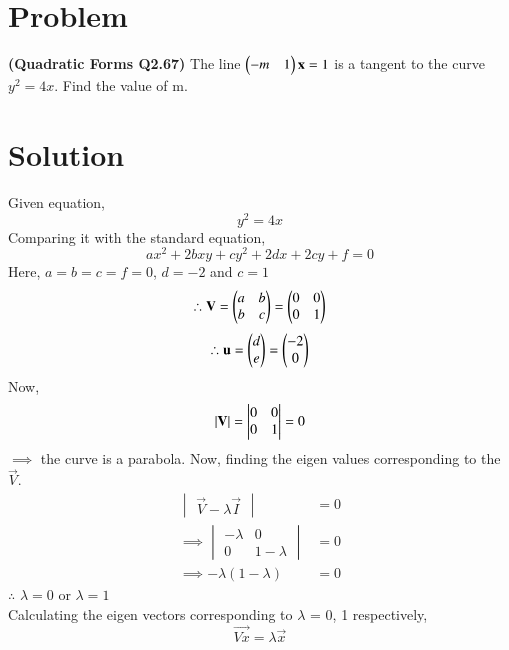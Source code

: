 \documentclass[journal,12pt,twocolumn]{IEEEtran}
\begin{document}
\section*{\textbf{Problem}}
\textbf{(Quadratic Forms Q2.67)} The line $\begin{pmatrix}-m & 1\end{pmatrix}\mathbf{x} = 1$ is a tangent to the curve $y^2 = 4x$. Find the value of m. 
\section*{\textbf{Solution}}
Given equation,
\begin{equation}
    y^2 = 4x
\end{equation}
Comparing it with the standard equation,
\begin{equation}
    ax^2 + 2bxy + cy^2 + 2dx + 2cy + f = 0
\end{equation}
Here, 
$a = b = c = f = 0$, $d = -2$ and $c = 1$
\begin{equation}
    \therefore \mathbf{V} = \begin{pmatrix}a & b \\ b & c\end{pmatrix} = \begin{pmatrix}0 & 0 \\ 0 & 1\end{pmatrix} \label{0.0.3}
\end{equation}
\begin{equation}
    \therefore \mathbf{u} = \begin{pmatrix}d \\ e\end{pmatrix} = \begin{pmatrix}-2 \\ 0\end{pmatrix} \label{0.0.4}
\end{equation}
Now,
\begin{equation}
   \vert\mathbf{V}\vert = \begin{vmatrix}0 & 0\\ 0 & 1\end{vmatrix} = 0 
\end{equation}
$\implies$ the curve is a parabola. Now, finding
the eigen values corresponding to the $\vec{V}$.
\begin{align}
    \begin{vmatrix}\vec{V} - \lambda\vec{I}\end{vmatrix} &= 0\\
    \implies \begin{vmatrix}
    -\lambda & 0 \\ 0 & 1 - \lambda
    \end{vmatrix} &= 0\\
    \implies -\lambda(1 - \lambda) &= 0
\end{align}
$\therefore$ $\lambda = 0$ or $\lambda = 1$\\
Calculating the eigen vectors corresponding to $\lambda$ = 0, 1 respectively,
\begin{equation}
    \vec{Vx} = \lambda\vec{x}
\end{equation}
\end{document}
